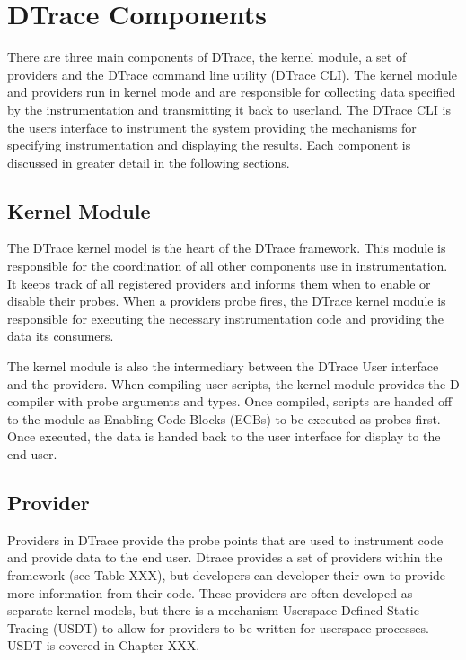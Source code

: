 

\section{DTrace Components}

There are three main components of DTrace, the kernel module, a set of providers and the DTrace command line utility (DTrace CLI). The kernel module and providers run in kernel mode and are responsible for collecting data specified by the instrumentation and transmitting it back to userland. The DTrace CLI is the users interface to instrument the system providing the mechanisms for specifying instrumentation and displaying the results. Each component is discussed in greater detail in the following sections.

\subsection{Kernel Module}

The DTrace kernel model is the heart of the DTrace framework. This module is responsible for the coordination of all other components use in instrumentation. It keeps track of all registered providers and informs them when to enable or disable their probes. When a providers probe fires, the DTrace kernel module is responsible for executing the necessary instrumentation code and providing the data its consumers.

The kernel module is also the intermediary between the DTrace User interface and the providers. When compiling user scripts, the kernel module provides the D compiler with probe arguments and types. Once compiled, scripts are handed off to the module as Enabling Code Blocks (ECBs) to be executed as probes first. Once executed, the data is handed back to the user interface for display to the end user.

\subsection{Provider}

Providers in DTrace provide the probe points that are used to instrument code and provide data to the end user. Dtrace provides a set of providers within the framework (see Table XXX), but developers can developer their own to provide more information from their code. These providers are often developed as separate kernel models, but there is a mechanism Userspace Defined Static Tracing (USDT) to allow for providers to be written for userspace processes. USDT is covered in Chapter XXX.

